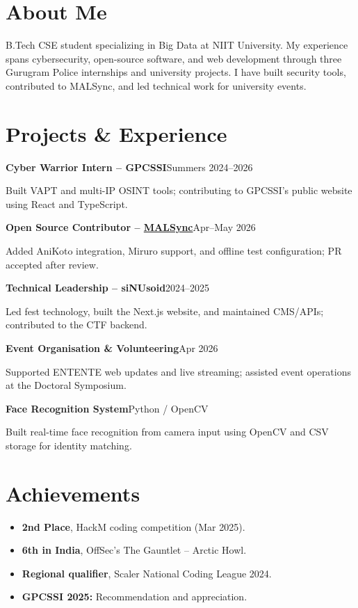 \documentclass[a4paper,10pt]{article}
\newcommand{\workEntry}[3]{%
    \textbf{#1}\hfill #2\par\vspace{3pt}
    #3\par\vspace{12pt}
}
\newlength{\mainwidth}
\newlength{\bodyheight}
\begin{document}
\begin{minipage}[t]{\mainwidth}
\vspace{10pt}
\begin{minipage}[t][\bodyheight][s]{\linewidth}
\fontsize{12.5}{15.5}\selectfont\raggedright
\vspace{0pt}
\section*{About Me}
B.Tech CSE student specializing in Big Data at NIIT University. My experience spans cybersecurity, open-source software, and web development through three Gurugram Police internships and university projects. I have built security tools, contributed to MALSync, and led technical work for university events.
\vfill

\section*{Projects \& Experience}
\workEntry{Cyber Warrior Intern -- GPCSSI}{Summers 2024--2026}{%
Built VAPT and multi-IP OSINT tools; contributing to GPCSSI's public website using React and TypeScript.}

\workEntry{Open Source Contributor -- \href{https://github.com/MALSync/MALSync/commit/293c12c3d7ff81b202267f497b5f33b17e4504a4}{MALSync}}{Apr--May 2026}{%
Added AniKoto integration, Miruro support, and offline test configuration; PR accepted after review.}

\workEntry{Technical Leadership -- siNUsoid}{2024--2025}{%
Led fest technology, built the Next.js website, and maintained CMS/APIs; contributed to the CTF backend.}

\workEntry{Event Organisation \& Volunteering}{Apr 2026}{%
Supported ENTENTE web updates and live streaming; assisted event operations at the Doctoral Symposium.}

\workEntry{Face Recognition System}{Python / OpenCV}{%
Built real-time face recognition from camera input using OpenCV and CSV storage for identity matching.}
\vfill

\section*{Achievements}
\begin{itemize}
    \item \textbf{2nd Place}, HackM coding competition (Mar 2025).
    \item \textbf{6th in India}, OffSec's The Gauntlet -- Arctic Howl.
    \item \textbf{Regional qualifier}, Scaler National Coding League 2024.
    \item \textbf{GPCSSI 2025:} Recommendation and appreciation.
\end{itemize}
\vfill


\end{minipage}
\end{minipage}
\end{document}
